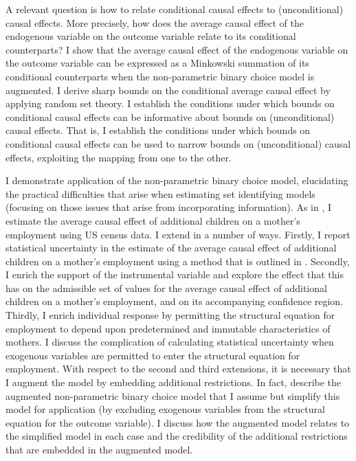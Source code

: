 \documentclass[10pt,a4paper,twoside]{article}
\numberwithin{equation}{section}
\begin{document}
A relevant question is how to relate conditional causal effects to (unconditional) causal effects. More precisely, how does the average causal effect of the endogenous variable on the outcome variable relate to its conditional counterparts? I show that the average causal effect of the endogenous variable on the outcome variable can be expressed as a Minkowski summation of its conditional counterparts when the non-parametric binary choice model is augmented. I derive sharp bounds on the conditional average causal effect by applying random set theory. I establish the conditions under which bounds on conditional causal effects can be informative about bounds on (unconditional) causal effects. That is, I establish the conditions under which bounds on conditional causal effects can be used to narrow bounds on (unconditional) causal effects, exploiting the mapping from one to the other. 


I demonstrate application of the non-parametric binary choice model, elucidating the practical difficulties that arise when estimating set identifying models (focusing on those issues that arise from incorporating information). As in \cite{cr13}, I estimate the average causal effect of additional children on a mother's employment using US census data. I extend \cite{cr13} in a number of ways. Firstly, I report statistical uncertainty in the estimate of the average causal effect of additional children on a mother's employment using a method that is outlined in \cite{cHlr13}. Secondly, I enrich the support of the instrumental variable and explore the effect that this has on the admissible set of values for the average causal effect of additional children on a mother's employment, and on its accompanying confidence region. Thirdly, I enrich individual response by permitting the structural equation for employment to depend upon predetermined and immutable characteristics of mothers. I discuss the complication of calculating statistical uncertainty when exogenous variables are permitted to enter the structural equation for employment. With respect to the second and third extensions, it is necessary that I augment the model by embedding additional restrictions. In fact, \cite{cr13} describe the augmented non-parametric binary choice model that I assume but simplify this model for application (by excluding exogenous variables from the structural equation for the outcome variable). I discuss how the augmented model relates to the simplified model in each case and the credibility of the additional restrictions that are embedded in the augmented model.
\end{document}
